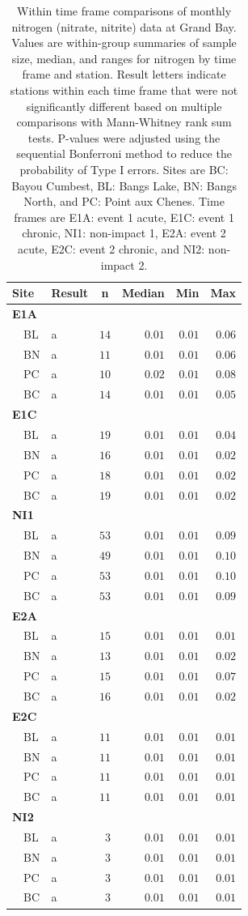 \documentclass[letterpaper,12pt]{article}\usepackage[]{graphicx}\usepackage[]{color}
\begin{document}
\clearpage

\begin{table}[!tbp]
\caption{Within time frame comparisons of monthly nitrogen (nitrate, nitrite) data at Grand Bay.  Values are within-group summaries of sample size, median, and ranges for nitrogen by time frame and station.  Result letters indicate stations within each time frame that were not significantly different based on multiple comparisons with Mann-Whitney rank sum tests.  P-values were adjusted using the sequential Bonferroni method to reduce the probability of Type I errors. Sites are BC: Bayou Cumbest, BL: Bangs Lake, BN: Bangs North, and PC: Point aux Chenes.  Time frames are E1A: event 1 acute, E1C: event 1 chronic, NI1: non-impact 1, E2A: event 2 acute, E2C: event 2 chronic, and NI2: non-impact 2.\label{tab:tntab2}} 
\begin{center}
\begin{tabular}{llrrrr}
\hline\hline
\multicolumn{1}{l}{Site}&\multicolumn{1}{c}{Result}&\multicolumn{1}{c}{n}&\multicolumn{1}{c}{Median}&\multicolumn{1}{c}{Min}&\multicolumn{1}{c}{Max}\tabularnewline
\hline
{\bfseries E1A}&&&&&\tabularnewline
~~BL&a&$14$&$0.01$&$0.01$&$0.06$\tabularnewline
~~BN&a&$11$&$0.01$&$0.01$&$0.06$\tabularnewline
~~PC&a&$10$&$0.02$&$0.01$&$0.08$\tabularnewline
~~BC&a&$14$&$0.01$&$0.01$&$0.05$\tabularnewline
\hline
{\bfseries E1C}&&&&&\tabularnewline
~~BL&a&$19$&$0.01$&$0.01$&$0.04$\tabularnewline
~~BN&a&$16$&$0.01$&$0.01$&$0.02$\tabularnewline
~~PC&a&$18$&$0.01$&$0.01$&$0.02$\tabularnewline
~~BC&a&$19$&$0.01$&$0.01$&$0.02$\tabularnewline
\hline
{\bfseries NI1}&&&&&\tabularnewline
~~BL&a&$53$&$0.01$&$0.01$&$0.09$\tabularnewline
~~BN&a&$49$&$0.01$&$0.01$&$0.10$\tabularnewline
~~PC&a&$53$&$0.01$&$0.01$&$0.10$\tabularnewline
~~BC&a&$53$&$0.01$&$0.01$&$0.09$\tabularnewline
\hline
{\bfseries E2A}&&&&&\tabularnewline
~~BL&a&$15$&$0.01$&$0.01$&$0.01$\tabularnewline
~~BN&a&$13$&$0.01$&$0.01$&$0.02$\tabularnewline
~~PC&a&$15$&$0.01$&$0.01$&$0.07$\tabularnewline
~~BC&a&$16$&$0.01$&$0.01$&$0.02$\tabularnewline
\hline
{\bfseries E2C}&&&&&\tabularnewline
~~BL&a&$11$&$0.01$&$0.01$&$0.01$\tabularnewline
~~BN&a&$11$&$0.01$&$0.01$&$0.01$\tabularnewline
~~PC&a&$11$&$0.01$&$0.01$&$0.01$\tabularnewline
~~BC&a&$11$&$0.01$&$0.01$&$0.01$\tabularnewline
\hline
{\bfseries NI2}&&&&&\tabularnewline
~~BL&a&$ 3$&$0.01$&$0.01$&$0.01$\tabularnewline
~~BN&a&$ 3$&$0.01$&$0.01$&$0.01$\tabularnewline
~~PC&a&$ 3$&$0.01$&$0.01$&$0.01$\tabularnewline
~~BC&a&$ 3$&$0.01$&$0.01$&$0.01$\tabularnewline
\hline
\end{tabular}\end{center}

\end{table}
\end{document}
